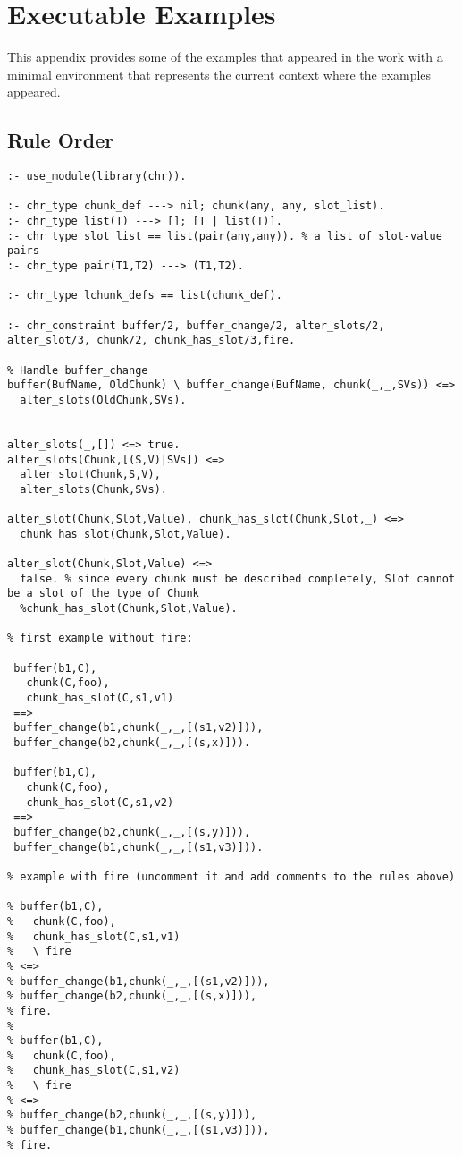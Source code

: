 \chapter{Executable Examples}

This appendix provides some of the examples that appeared in the work with a minimal environment that represents the current context where the examples appeared.

\section{Rule Order}
\label{app:ex:rule_order}

\begin{lstlisting}
:- use_module(library(chr)).

:- chr_type chunk_def ---> nil; chunk(any, any, slot_list).
:- chr_type list(T) ---> []; [T | list(T)].
:- chr_type slot_list == list(pair(any,any)). % a list of slot-value pairs
:- chr_type pair(T1,T2) ---> (T1,T2).

:- chr_type lchunk_defs == list(chunk_def).

:- chr_constraint buffer/2, buffer_change/2, alter_slots/2, alter_slot/3, chunk/2, chunk_has_slot/3,fire.

% Handle buffer_change
buffer(BufName, OldChunk) \ buffer_change(BufName, chunk(_,_,SVs)) <=>
  alter_slots(OldChunk,SVs).

  
alter_slots(_,[]) <=> true.
alter_slots(Chunk,[(S,V)|SVs]) <=> 
  alter_slot(Chunk,S,V),
  alter_slots(Chunk,SVs).
  
alter_slot(Chunk,Slot,Value), chunk_has_slot(Chunk,Slot,_) <=>
  chunk_has_slot(Chunk,Slot,Value).
  
alter_slot(Chunk,Slot,Value) <=>
  false. % since every chunk must be described completely, Slot cannot be a slot of the type of Chunk
  %chunk_has_slot(Chunk,Slot,Value).  

% first example without fire: 
  
 buffer(b1,C),
   chunk(C,foo),
   chunk_has_slot(C,s1,v1)
 ==>
 buffer_change(b1,chunk(_,_,[(s1,v2)])),
 buffer_change(b2,chunk(_,_,[(s,x)])).
 
 buffer(b1,C),
   chunk(C,foo),
   chunk_has_slot(C,s1,v2)
 ==>
 buffer_change(b2,chunk(_,_,[(s,y)])),
 buffer_change(b1,chunk(_,_,[(s1,v3)])).

% example with fire (uncomment it and add comments to the rules above) 
 
% buffer(b1,C),
%   chunk(C,foo),
%   chunk_has_slot(C,s1,v1)
%   \ fire
% <=>
% buffer_change(b1,chunk(_,_,[(s1,v2)])),
% buffer_change(b2,chunk(_,_,[(s,x)])),
% fire.
% 
% buffer(b1,C),
%   chunk(C,foo),
%   chunk_has_slot(C,s1,v2)
%   \ fire
% <=>
% buffer_change(b2,chunk(_,_,[(s,y)])),
% buffer_change(b1,chunk(_,_,[(s1,v3)])),
% fire.
\end{lstlisting}

